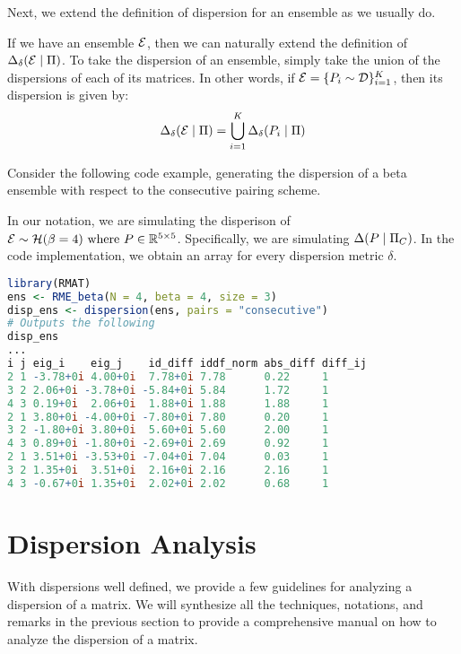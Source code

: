 Next, we extend the definition of dispersion for an ensemble as we usually do.

\begin{definition}
If we have an ensemble $\mathcal{E}$, then we can naturally extend the definition of $\Delta_\delta(\mathcal{E} \mid \Pi)$.
To take the dispersion of an ensemble, simply take the union of the dispersions of each of its matrices.
In other words, if $\mathcal{E} = \{P_i \sim \mathcal{D}\}_{i = 1}^K$, then its dispersion is given by:
$$\Delta_\delta(\mathcal{E} \mid \Pi) = \bigcup_{i=1}^K \Delta_\delta(P_i \mid \Pi)$$
\end{definition}

Consider the following code example, generating the dispersion of a beta ensemble with respect to the consecutive pairing scheme.

\begin{code}
In our notation, we are simulating the disperison of $\mathcal{E} \sim \mathcal{H}(\beta = 4) \text{ where } P \in \mathbb{R}^{5 \times 5}$.
Specifically, we are simulating $\Delta(P \mid \Pi_C)$. In the code implementation, we obtain an array for every dispersion metric $\delta$.
\end{code}
\begin{lstlisting}[language=R]
library(RMAT)
ens <- RME_beta(N = 4, beta = 4, size = 3)
disp_ens <- dispersion(ens, pairs = "consecutive")
# Outputs the following
disp_ens
...
i j eig_i    eig_j    id_diff iddf_norm abs_diff diff_ij
2 1 -3.78+0i 4.00+0i  7.78+0i 7.78      0.22     1
3 2 2.06+0i -3.78+0i -5.84+0i 5.84      1.72     1
4 3 0.19+0i  2.06+0i  1.88+0i 1.88      1.88     1
2 1 3.80+0i -4.00+0i -7.80+0i 7.80      0.20     1
3 2 -1.80+0i 3.80+0i  5.60+0i 5.60      2.00     1
4 3 0.89+0i -1.80+0i -2.69+0i 2.69      0.92     1
2 1 3.51+0i -3.53+0i -7.04+0i 7.04      0.03     1
3 2 1.35+0i  3.51+0i  2.16+0i 2.16      2.16     1
4 3 -0.67+0i 1.35+0i  2.02+0i 2.02      0.68     1
\end{lstlisting}


\section{Dispersion Analysis}

With dispersions well defined, we provide a few guidelines for analyzing a dispersion of a matrix.
We will synthesize all the techniques, notations, and remarks in the previous section to provide a comprehensive manual on how to analyze the dispersion of a matrix.

